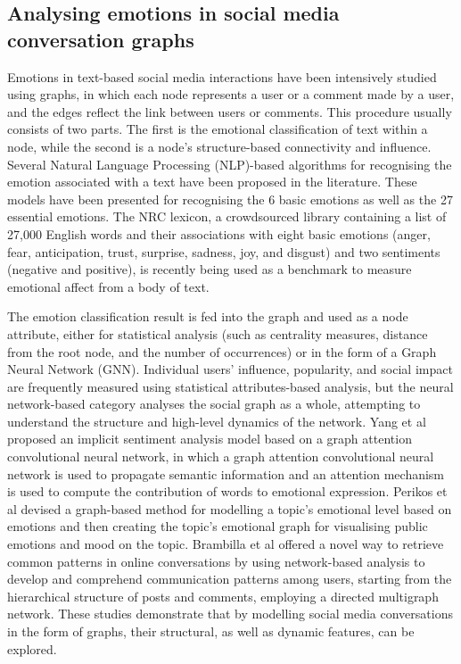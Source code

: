 \documentclass[acmtog]{acmart}
\begin{document}
\subsection{Analysing emotions in social media conversation graphs}
Emotions in text-based social media interactions have been intensively studied using graphs, in which each node represents a user or a comment made by a user, and the edges reflect the link between users or comments. This procedure usually consists of two parts. The first is the emotional classification of text within a node, while the second is a node's structure-based connectivity and influence. Several Natural Language Processing (NLP)-based algorithms for recognising the emotion associated with a text have been proposed in the literature. These models have been presented for recognising the 6 basic emotions as well as the 27 essential emotions. The NRC lexicon, a crowdsourced library containing a list of 27,000 English words and their associations with eight basic emotions (anger, fear, anticipation, trust, surprise, sadness, joy, and disgust) and two sentiments (negative and positive), is recently being used as a benchmark to measure emotional affect from a body of text.

The emotion classification result is fed into the graph and used as a node attribute, either for statistical analysis (such as centrality measures, distance from the root node, and the number of occurrences) or in the form of a Graph Neural Network (GNN). Individual users' influence, popularity, and social impact are frequently measured using statistical attributes-based analysis, but the neural network-based category analyses the social graph as a whole, attempting to understand the structure and high-level dynamics of the network. Yang et al proposed an implicit sentiment analysis model based on a graph attention convolutional neural network, in which a graph attention convolutional neural network is used to propagate semantic information and an attention mechanism is used to compute the contribution of words to emotional expression. Perikos et al devised a graph-based method for modelling a topic's emotional level based on emotions and then creating the topic's emotional graph for visualising public emotions and mood on the topic. Brambilla et al offered a novel way to retrieve common patterns in online conversations by using network-based analysis to develop and comprehend communication patterns among users, starting from the hierarchical structure of posts and comments, employing a directed multigraph network. These studies demonstrate that by modelling social media conversations in the form of graphs, their structural, as well as dynamic features, can be explored.
\end{document}
